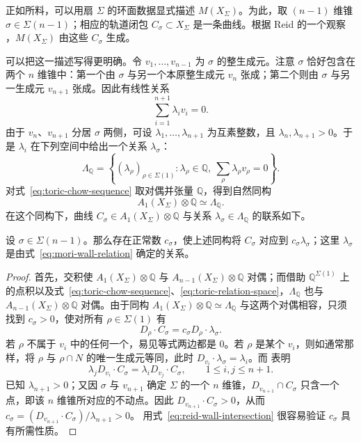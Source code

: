 正如所料，可以用扇 $\Sigma$ 的环面数据显式描述 $M(X_\Sigma)$。为此，取 $(n-1)$ 维锥 $\sigma\in\Sigma(n-1)$；相应的轨道闭包 $C_\sigma\subset X_\Sigma$ 是一条曲线。根据 Reid 的一个观察 ，$M(X_\Sigma)$ 由这些 $C_\sigma$ 生成。

可以把这一描述写得更明确。令 $v_1,\ldots,v_{n-1}$ 为 $\sigma$ 的整生成元。注意 $\sigma$ 恰好包含在两个 $n$ 维锥中：第一个由 $\sigma$ 与另一个本原整生成元 $v_n$ 张成；第二个则由 $\sigma$ 与另一生成元 $v_{n+1}$ 张成。因此有线性关系
\begin{equation}\label{eq:mori-wall-relation}
\sum_{i=1}^{n+1}\lambda_i v_i=0.
\end{equation}
由于 $v_n$、$v_{n+1}$ 分居 $\sigma$ 两侧，可设 $\lambda_1,\ldots,\lambda_{n+1}$ 为互素整数，且 $\lambda_n,\lambda_{n+1}>0$。于是 $\lambda_i$ 在下列空间中给出一个关系 $\lambda_\sigma$：
\begin{equation}\label{eq:toric-relation-space}
\Lambda_{\mathbb Q}=
\left\{(\lambda_\rho)_{\rho\in\Sigma(1)}:
\lambda_\rho\in\mathbb Q,\ 
\sum_\rho\lambda_\rho v_\rho=0\right\}.
\end{equation}
对式~\eqref{eq:toric-chow-sequence} 取对偶并张量 $\mathbb Q$，得到自然同构
\[
A_1(X_\Sigma)\otimes\mathbb Q\simeq\Lambda_{\mathbb Q}.
\]
在这个同构下，曲线 $C_\sigma\in A_1(X_\Sigma)\otimes\mathbb Q$ 与关系 $\lambda_\sigma\in\Lambda_{\mathbb Q}$ 的联系如下。

\begin{lemma}\label{lem:mori-wall-curve}
设 $\sigma\in\Sigma(n-1)$。那么存在正常数 $c_\sigma$，使上述同构将 $C_\sigma$ 对应到 $c_\sigma\lambda_\sigma$；这里 $\lambda_\sigma$ 是由式~\eqref{eq:mori-wall-relation} 确定的关系。
\end{lemma}

\begin{proof}
首先，交积使 $A_1(X_\Sigma)\otimes\mathbb Q$ 与 $A_{n-1}(X_\Sigma)\otimes\mathbb Q$ 对偶；而借助 $\mathbb Q^{\Sigma(1)}$ 上的点积以及式~\eqref{eq:toric-chow-sequence}、\eqref{eq:toric-relation-space}，$\Lambda_{\mathbb Q}$ 也与 $A_{n-1}(X_\Sigma)\otimes\mathbb Q$ 对偶。由于同构
$A_1(X_\Sigma)\otimes\mathbb Q\simeq\Lambda_{\mathbb Q}$
与这两个对偶相容，只须找到 $c_\sigma>0$，使对所有 $\rho\in\Sigma(1)$ 有
\[
D_\rho\cdot C_\sigma=c_\sigma D_\rho\cdot\lambda_\sigma.
\]
若 $\rho$ 不属于 $v_i$ 中的任何一个，易见等式两边都是 $0$。若 $\rho$ 是某个 $v_i$，则如通常那样，将 $\rho$ 与 $\rho\cap N$ 的唯一生成元等同，此时 $D_{v_i}\cdot\lambda_\sigma=\lambda_i$。而  表明
\begin{equation}\label{eq:reid-wall-intersection}
\lambda_j D_{v_i}\cdot C_\sigma
=\lambda_i D_{v_j}\cdot C_\sigma,
\qquad 1\leq i,j\leq n+1.
\end{equation}
已知 $\lambda_{n+1}>0$；又因 $\sigma$ 与 $v_{n+1}$ 确定 $\Sigma$ 的一个 $n$ 维锥，$D_{v_{n+1}}\cap C_\sigma$ 只含一个点，即该 $n$ 维锥所对应的不动点。因此
$D_{v_{n+1}}\cdot C_\sigma>0$，从而
$c_\sigma=(D_{v_{n+1}}\cdot C_\sigma)/\lambda_{n+1}>0$。
用式~\eqref{eq:reid-wall-intersection} 很容易验证 $c_\sigma$ 具有所需性质。
\end{proof}

